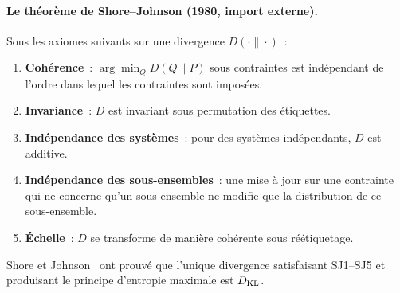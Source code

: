 \documentclass[12pt,a4paper]{article}
\begin{document}
\paragraph{Le théorème de Shore--Johnson (1980, import externe).}
Sous les axiomes suivants sur une divergence $D(\cdot\|\cdot)$~:
\begin{enumerate}[label=(SJ\arabic*)]
\item \textbf{Cohérence}~: $\arg\min_Q D(Q\|P)$ sous contraintes est
  indépendant de l'ordre dans lequel les contraintes sont imposées.
\item \textbf{Invariance}~: $D$ est invariant sous permutation des
  étiquettes.
\item \textbf{Indépendance des systèmes}~: pour des systèmes
  indépendants, $D$ est additive.
\item \textbf{Indépendance des sous-ensembles}~: une mise à jour sur
  une contrainte qui ne concerne qu'un sous-ensemble ne modifie que la
  distribution de ce sous-ensemble.
\item \textbf{Échelle}~: $D$ se transforme de manière cohérente sous
  réétiquetage.
\end{enumerate}
Shore et Johnson~\cite{ShoreJohnson1980} ont prouvé que l'unique
divergence satisfaisant SJ1--SJ5 et produisant le principe d'entropie
maximale est $D_{\mathrm{KL}}$.
\end{document}
